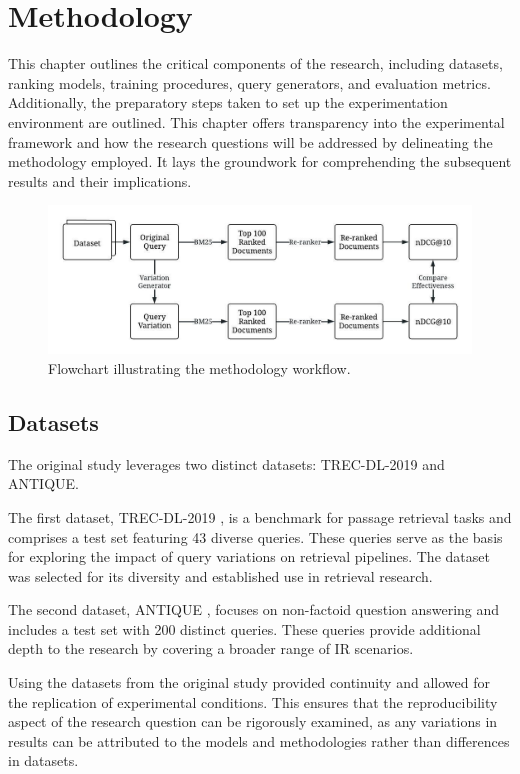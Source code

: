 \chapter{Methodology}
This chapter outlines the critical components of the research, including datasets, ranking models, training procedures, query generators, and evaluation metrics. Additionally, the preparatory steps taken to set up the experimentation environment are outlined. This chapter offers transparency into the experimental framework and how the research questions will be addressed by delineating the methodology employed. It lays the groundwork for comprehending the subsequent results and their implications.

\begin{figure}[h]
\centering
\includegraphics[width=\textwidth]{4Methodology/method.jpeg}
\caption{Flowchart illustrating the methodology workflow.}
\label{fig:method}
\end{figure}

\section{Datasets}
The original study leverages two distinct datasets: TREC-DL-2019 and ANTIQUE.

The first dataset, TREC-DL-2019 \cite{trec}, is a benchmark for passage retrieval tasks and comprises a test set featuring 43 diverse queries. These queries serve as the basis for exploring the impact of query variations on retrieval pipelines. The dataset was selected for its diversity and established use in retrieval research.

The second dataset, ANTIQUE \cite{antique}, focuses on non-factoid question answering and includes a test set with 200 distinct queries. These queries provide additional depth to the research by covering a broader range of IR scenarios.

Using the datasets from the original study provided continuity and allowed for the replication of experimental conditions. This ensures that the reproducibility aspect of the research question can be rigorously examined, as any variations in results can be attributed to the models and methodologies rather than differences in datasets.

